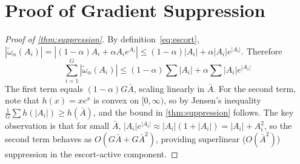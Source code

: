 \documentclass[11pt]{article}
\theoremstyle{definition}
\theoremstyle{remark}
\begin{document}
\section{Proof of Gradient Suppression}
\label{app:suppression}

\begin{proof}[Proof of \cref{thm:suppression}]
By definition~\eqref{eq:escort}, $|\tilde{\omega}_\alpha(A_i)| = |(1-\alpha)A_i + \alpha A_i e^{A_i}| \leq (1-\alpha)|A_i| + \alpha |A_i| e^{|A_i|}$. Therefore
\begin{equation}
    \sum_{i=1}^G |\tilde{\omega}_\alpha(A_i)| \leq (1-\alpha)\sum|A_i| + \alpha \sum |A_i| e^{|A_i|}
\end{equation}
The first term equals $(1-\alpha)G\bar{A}$, scaling linearly in $\bar{A}$. For the second term, note that $h(x) = x e^x$ is convex on $[0,\infty)$, so by Jensen's inequality $\frac{1}{G}\sum h(|A_i|) \geq h(\bar{A})$, and the bound in \cref{thm:suppression} follows. The key observation is that for small $\bar{A}$, $|A_i| e^{|A_i|} \approx |A_i|(1 + |A_i|) = |A_i| + A_i^2$, so the second term behaves as $O(G\bar{A} + G\bar{A}^2)$, providing superlinear ($O(\bar{A}^2)$) suppression in the escort-active component.
\end{proof}
\end{document}
